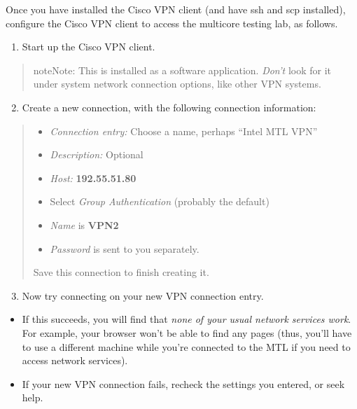 \documentclass[letterpaper,10pt,openany,oneside]{sphinxmanual}
\begin{document}
Once you have installed the Cisco VPN client (and have ssh and scp installed), configure the Cisco VPN client to access the multicore testing lab, as follows.
\begin{enumerate}
\item {} 
Start up the Cisco VPN client.

\end{enumerate}
\begin{quote}

\begin{notice}{note}{Note:}
This is installed as a software application. \emph{Don't} look for it under system network connection options, like other VPN systems.
\end{notice}
\end{quote}
\begin{enumerate}
\setcounter{enumi}{1}
\item {} 
Create a new connection, with the following connection information:

\end{enumerate}
\begin{quote}
\begin{itemize}
\item {} 
\emph{Connection entry:} Choose a name, perhaps ``Intel MTL VPN''

\item {} 
\emph{Description:} Optional

\item {} 
\emph{Host:} \textbf{192.55.51.80}

\item {} 
Select \emph{Group Authentication} (probably the default)

\item {} 
\emph{Name} is \textbf{VPN2}

\item {} 
\emph{Password} is sent to you separately.

\end{itemize}

Save this connection to finish creating it.
\end{quote}
\begin{enumerate}
\setcounter{enumi}{2}
\item {} 
Now try connecting on your new VPN connection entry.

\end{enumerate}
\begin{itemize}
\item {} 
If this succeeds, you will find that \emph{none of your usual network services work}. For example, your browser won't be able to find any pages (thus, you'll have to use a different machine while you're connected to the MTL if you need to access network services).

\item {} 
If your new VPN connection fails, recheck the settings you entered, or seek help.

\end{itemize}
\end{document}
